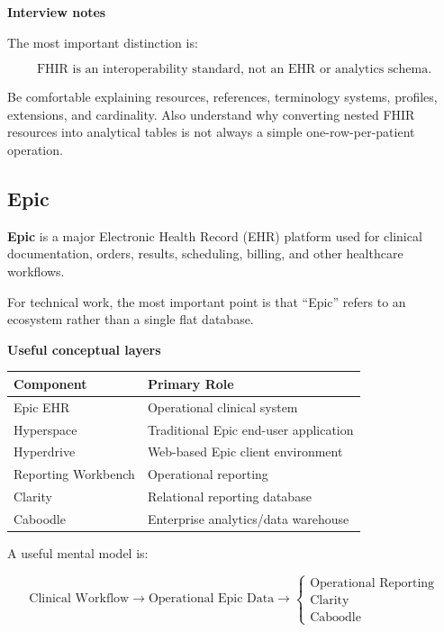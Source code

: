 \documentclass[11pt,letterpaper]{article}
\begin{document}
\textbf{Interview notes}

The most important distinction is:

\[
\boxed{\text{FHIR is an interoperability standard, not an EHR or analytics schema.}}
\]

Be comfortable explaining resources, references, terminology systems,
profiles, extensions, and cardinality. Also understand why converting nested
FHIR resources into analytical tables is not always a simple one-row-per-patient
operation.



\subsection{Epic}

\textbf{Epic} is a major Electronic Health Record (EHR) platform used for
clinical documentation, orders, results, scheduling, billing, and other
healthcare workflows.

For technical work, the most important point is that ``Epic'' refers to an
ecosystem rather than a single flat database.

\textbf{Useful conceptual layers}

\begin{center}
\begin{tabularx}{\textwidth}{lX}
\toprule
Component & Primary Role \\
\midrule
Epic EHR & Operational clinical system \\
Hyperspace & Traditional Epic end-user application \\
Hyperdrive & Web-based Epic client environment \\
Reporting Workbench & Operational reporting \\
Clarity & Relational reporting database \\
Caboodle & Enterprise analytics/data warehouse \\
\bottomrule
\end{tabularx}
\end{center}

A useful mental model is:

\[
\text{Clinical Workflow}
\rightarrow
\text{Operational Epic Data}
\rightarrow
\begin{cases}
\text{Operational Reporting} \\
\text{Clarity} \\
\text{Caboodle}
\end{cases}
\]
\end{document}
